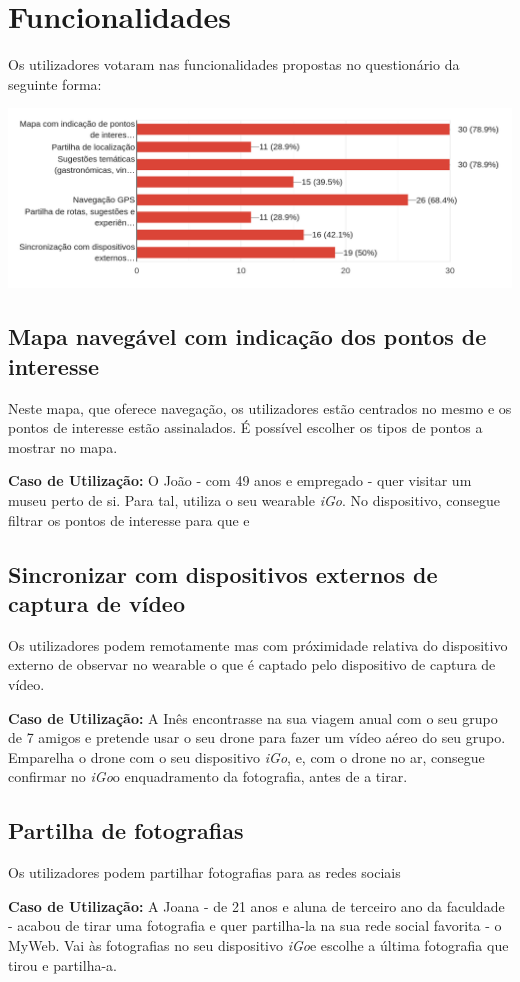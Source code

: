 \documentclass[a4paper]{article}
\newcommand{\igo}{\textit{iGo}}
\begin{document}
\section{Funcionalidades}
Os utilizadores votaram nas funcionalidades propostas no questionário da
seguinte forma:

\begin{center}
  \includegraphics[width=\linewidth]{resp}
\end{center}
\begin{multicols}{2}

  \subsection{Mapa navegável com indicação dos pontos de interesse}
  Neste mapa, que oferece navegação, os utilizadores estão centrados no mesmo e
  os pontos de interesse estão assinalados. É possível escolher os tipos de
  pontos a mostrar no mapa.

  \textbf{Caso de Utilização:} O João - com 49 anos e empregado - quer visitar
  um museu perto de si. Para tal, utiliza o seu wearable \igo . No dispositivo,
  consegue filtrar os pontos de interesse para que e

  \subsection{Sincronizar com dispositivos externos de captura de vídeo}
  Os utilizadores podem remotamente mas com próximidade relativa do dispositivo
  externo de observar no wearable o que é captado pelo dispositivo de captura de
  vídeo.

  \textbf{Caso de Utilização:} A Inês encontrasse na sua viagem anual com o seu
  grupo de 7 amigos e pretende usar o seu drone para fazer um vídeo
  aéreo do seu grupo. Emparelha o drone com o seu dispositivo \igo, e, com o
  drone no ar, consegue confirmar no \igo  o enquadramento da fotografia, antes
  de a tirar.

  \subsection{Partilha de fotografias}
  Os utilizadores podem partilhar fotografias para as redes sociais

  \textbf{Caso de Utilização:} A Joana - de 21 anos e aluna de terceiro ano da
  faculdade - acabou de tirar uma fotografia e quer
  partilha-la na sua rede social favorita - o MyWeb. Vai às fotografias no seu
  dispositivo \igo  e escolhe a última fotografia que tirou e partilha-a.

\end{multicols}
\end{document}

